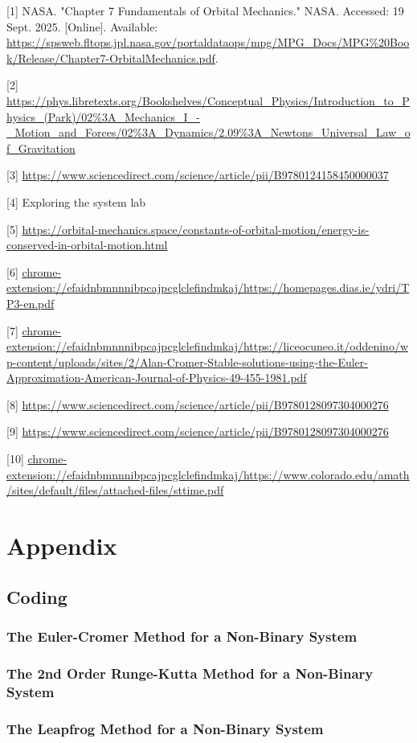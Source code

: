 \documentclass[11 pt, a4paper]{article}
\begin{document}
[1] NASA. "Chapter 7 Fundamentals of Orbital Mechanics." NASA. Accessed: 19 Sept. 2025. [Online]. Available: \url{https://spsweb.fltops.jpl.nasa.gov/portaldataops/mpg/MPG_Docs/MPG%20Book/Release/Chapter7-OrbitalMechanics.pdf}.

[2] \url{https://phys.libretexts.org/Bookshelves/Conceptual_Physics/Introduction_to_Physics_(Park)/02%3A_Mechanics_I_-_Motion_and_Forces/02%3A_Dynamics/2.09%3A_Newtons_Universal_Law_of_Gravitation}

[3] \url{https://www.sciencedirect.com/science/article/pii/B9780124158450000037}

[4] Exploring the system lab

[5] \url{https://orbital-mechanics.space/constants-of-orbital-motion/energy-is-conserved-in-orbital-motion.html}

[6] \url{chrome-extension://efaidnbmnnnibpcajpcglclefindmkaj/https://homepages.dias.ie/ydri/TP3-en.pdf}

[7] \url{chrome-extension://efaidnbmnnnibpcajpcglclefindmkaj/https://liceocuneo.it/oddenino/wp-content/uploads/sites/2/Alan-Cromer-Stable-solutions-using-the-Euler-Approximation-American-Journal-of-Physics-49-455-1981.pdf}

[8] \url{https://www.sciencedirect.com/science/article/pii/B9780128097304000276}

[9] \url{https://www.sciencedirect.com/science/article/pii/B9780128097304000276}

[10] \url{chrome-extension://efaidnbmnnnibpcajpcglclefindmkaj/https://www.colorado.edu/amath/sites/default/files/attached-files/sttime.pdf}

\newpage
\section{Appendix}

\subsection{Coding}
\subsubsection{The Euler-Cromer Method for a Non-Binary System}


\subsubsection{The 2nd Order Runge-Kutta Method for a Non-Binary System}


\subsubsection{The Leapfrog Method for a Non-Binary System}

\end{document}
